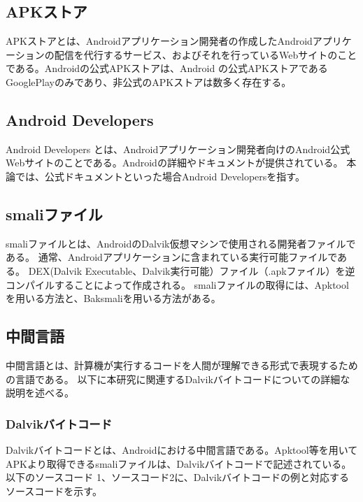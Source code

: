 \subsection{APKストア}
APKストアとは、Androidアプリケーション開発者の作成したAndroidアプリケーションの配信を代行するサービス、およびそれを行っているWebサイトのことである。Androidの公式APKストアは、Android の公式APKストアであるGooglePlay\cite{GooglePlay}のみであり、非公式のAPKストアは数多く存在する。


\subsection{Android Developers}
Android Developers とは、Androidアプリケーション開発者向けのAndroid公式Webサイトのことである\cite{Android_Developers}。Androidの詳細やドキュメントが提供されている。
本論では、公式ドキュメントといった場合Android Developersを指す。


\subsection{smaliファイル}
smaliファイルとは、AndroidのDalvik仮想マシンで使用される開発者ファイルである。
通常、Androidアプリケーションに含まれている実行可能ファイルである。
DEX(Dalvik Executable、Dalvik実行可能）ファイル（.apkファイル）を逆コンパイルすることによって作成される。
smaliファイルの取得には、Apktool\cite{Apktool}を用いる方法と、Baksmali\cite{Baksmali}を用いる方法がある。



\subsection{中間言語}
中間言語とは、計算機が実行するコードを人間が理解できる形式で表現するための言語である。
以下に本研究に関連するDalvikバイトコードについての詳細な説明を述べる。


\subsubsection{Dalvikバイトコード}
Dalvikバイトコードとは、Androidにおける中間言語である。Apktool等を用いてAPKより取得できるsmaliファイルは、Dalvikバイトコードで記述されている。以下のソースコード 1、ソースコード2に、Dalvikバイトコードの例と対応するソースコードを示す。

